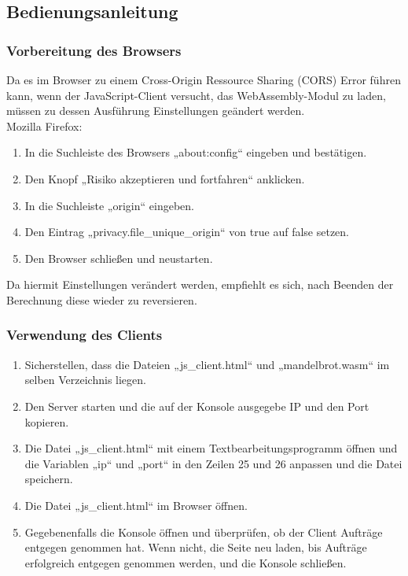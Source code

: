 \documentclass[12pt, onecolumn, notitlepage]{scrartcl}
\begin{document}
\subsection{Bedienungsanleitung}
\subsubsection{Vorbereitung des Browsers}
Da es im Browser zu einem Cross-Origin Ressource Sharing (CORS) Error führen kann, wenn der JavaScript-Client versucht, das WebAssembly-Modul zu laden, müssen zu dessen Ausführung Einstellungen geändert werden. \\
Mozilla Firefox: 
\begin{enumerate}
	\setlength\itemsep{0.07em}
	\item In die Suchleiste des Browsers „about:config“ eingeben und bestätigen.
	\item Den Knopf „Risiko akzeptieren und fortfahren“ anklicken.
	\item In die Suchleiste „origin“ eingeben.
	\item Den Eintrag „privacy.file\_unique\_origin“ von true auf false setzen.
	\item Den Browser schließen und neustarten.
\end{enumerate}
Da hiermit Einstellungen verändert werden, empfiehlt es sich, nach Beenden der Berechnung diese wieder zu reversieren.
\subsubsection{Verwendung des Clients}
\begin{enumerate}
	\setlength\itemsep{0.07em}
	\item Sicherstellen, dass die Dateien „js\_client.html“ und „mandelbrot.wasm“ im selben Verzeichnis liegen.
	\item Den Server starten und die auf der Konsole ausgegebe IP und den Port kopieren.
	\item Die Datei „js\_client.html“ mit einem Textbearbeitungsprogramm öffnen und die Variablen „ip“ und „port“ in den Zeilen 25 und 26 anpassen und die Datei speichern.
	\item Die Datei „js\_client.html“ im Browser öffnen.
	\item Gegebenenfalls die Konsole öffnen und überprüfen, ob der Client Aufträge entgegen genommen hat. Wenn nicht, die Seite neu laden, bis Aufträge erfolgreich entgegen genommen werden, und die Konsole schließen.
\end{enumerate}
\end{document}
